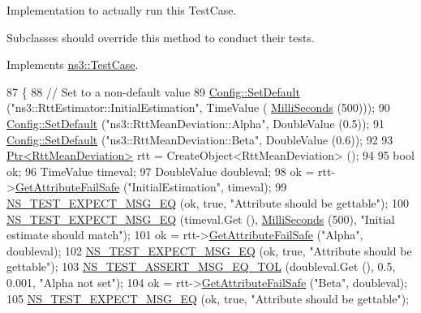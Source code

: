 Implementation to actually run this Test\+Case. 

Subclasses should override this method to conduct their tests. 

Implements \hyperlink{classns3_1_1TestCase_a8ff74680cf017ed42011e4be51917a24}{ns3\+::\+Test\+Case}.


\begin{DoxyCode}
87 \{
88   \textcolor{comment}{// Set to a non-default value}
89   \hyperlink{group__config_ga2e7882df849d8ba4aaad31c934c40c06}{Config::SetDefault} (\textcolor{stringliteral}{"ns3::RttEstimator::InitialEstimation"}, TimeValue (
      \hyperlink{group__timecivil_gaf26127cf4571146b83a92ee18679c7a9}{MilliSeconds} (500)));
90   \hyperlink{group__config_ga2e7882df849d8ba4aaad31c934c40c06}{Config::SetDefault} (\textcolor{stringliteral}{"ns3::RttMeanDeviation::Alpha"}, DoubleValue (0.5));
91   \hyperlink{group__config_ga2e7882df849d8ba4aaad31c934c40c06}{Config::SetDefault} (\textcolor{stringliteral}{"ns3::RttMeanDeviation::Beta"}, DoubleValue (0.6));
92 
93   \hyperlink{classns3_1_1Ptr}{Ptr<RttMeanDeviation>} rtt = CreateObject<RttMeanDeviation> ();
94 
95   \textcolor{keywordtype}{bool} ok;
96   TimeValue timeval;
97   DoubleValue doubleval;
98   ok = rtt->\hyperlink{classns3_1_1ObjectBase_a3fdec0e0ebed2c251c3a17ba6ba787da}{GetAttributeFailSafe} (\textcolor{stringliteral}{"InitialEstimation"}, timeval);
99   \hyperlink{group__testing_ga7304ba46a28d8cf08dfdfd6499cf7068}{NS\_TEST\_EXPECT\_MSG\_EQ} (ok, \textcolor{keyword}{true}, \textcolor{stringliteral}{"Attribute should be gettable"});
100   \hyperlink{group__testing_ga7304ba46a28d8cf08dfdfd6499cf7068}{NS\_TEST\_EXPECT\_MSG\_EQ} (timeval.Get (), \hyperlink{group__timecivil_gaf26127cf4571146b83a92ee18679c7a9}{MilliSeconds} (500), \textcolor{stringliteral}{"Initial
       estimate should match"});
101   ok = rtt->\hyperlink{classns3_1_1ObjectBase_a3fdec0e0ebed2c251c3a17ba6ba787da}{GetAttributeFailSafe} (\textcolor{stringliteral}{"Alpha"}, doubleval);
102   \hyperlink{group__testing_ga7304ba46a28d8cf08dfdfd6499cf7068}{NS\_TEST\_EXPECT\_MSG\_EQ} (ok, \textcolor{keyword}{true}, \textcolor{stringliteral}{"Attribute should be gettable"});
103   \hyperlink{group__testing_ga9e7861b56b4e70db3b56044cb7a28e41}{NS\_TEST\_ASSERT\_MSG\_EQ\_TOL} (doubleval.Get (), 0.5, 0.001, \textcolor{stringliteral}{"Alpha not set"});
104   ok = rtt->\hyperlink{classns3_1_1ObjectBase_a3fdec0e0ebed2c251c3a17ba6ba787da}{GetAttributeFailSafe} (\textcolor{stringliteral}{"Beta"}, doubleval);
105   \hyperlink{group__testing_ga7304ba46a28d8cf08dfdfd6499cf7068}{NS\_TEST\_EXPECT\_MSG\_EQ} (ok, \textcolor{keyword}{true}, \textcolor{stringliteral}{"Attribute should be gettable"});

\end{DoxyCode}
